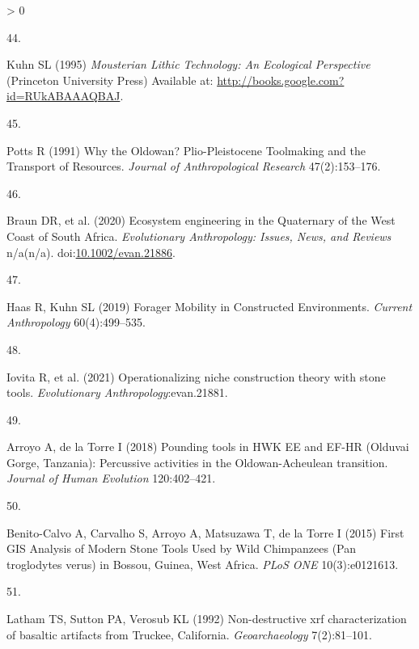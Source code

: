 \documentclass[9pt,twocolumn,twoside,]{pnas-new}
\newlength{\csllabelwidth}
\newlength{\cslhangindent}
\newenvironment{CSLReferences}[3] %
 {%
  \setlength{\parindent}{0pt}
  \ifodd #1 \everypar{\setlength{\hangindent}{\cslhangindent}}\ignorespaces\fi
  \ifnum #2 > 0
  \setlength{\parskip}{#2\baselineskip}
  \fi
 }%
 {}
\newcommand{\CSLLeftMargin}[1]{\parbox[t]{\csllabelwidth}{#1}}
\newcommand{\CSLRightInline}[1]{\parbox[t]{\linewidth - \csllabelwidth}{#1}}
\begin{document}
\begin{CSLReferences}{0}{0}
\leavevmode\hypertarget{ref-kuhnMousterianLithicTechnology1995}{}%
\CSLLeftMargin{44. }
\CSLRightInline{Kuhn SL (1995) \emph{Mousterian {Lithic Technology}: {An
Ecological Perspective}} ({Princeton University Press}) Available at:
\url{http://books.google.com?id=RUkABAAAQBAJ}.}

\leavevmode\hypertarget{ref-pottsWhyOldowanPlioPleistocene1991}{}%
\CSLLeftMargin{45. }
\CSLRightInline{Potts R (1991) Why the {Oldowan}? {Plio}-{Pleistocene
Toolmaking} and the {Transport} of {Resources}. \emph{Journal of
Anthropological Research} 47(2):153--176.}

\leavevmode\hypertarget{ref-braunEcosystemEngineeringQuaternary2020}{}%
\CSLLeftMargin{46. }
\CSLRightInline{Braun DR, et al. (2020) Ecosystem engineering in the
{Quaternary} of the {West Coast} of {South Africa}. \emph{Evolutionary
Anthropology: Issues, News, and Reviews} n/a(n/a).
doi:\href{https://doi.org/10.1002/evan.21886}{10.1002/evan.21886}.}

\leavevmode\hypertarget{ref-haasForagerMobilityConstructed2019}{}%
\CSLLeftMargin{47. }
\CSLRightInline{Haas R, Kuhn SL (2019) Forager {Mobility} in
{Constructed Environments}. \emph{Current Anthropology} 60(4):499--535.}

\leavevmode\hypertarget{ref-iovitaOperationalizingNicheConstruction2021}{}%
\CSLLeftMargin{48. }
\CSLRightInline{Iovita R, et al. (2021) Operationalizing niche
construction theory with stone tools. \emph{Evolutionary
Anthropology}:evan.21881.}

\leavevmode\hypertarget{ref-arroyoPoundingToolsHWK2018}{}%
\CSLLeftMargin{49. }
\CSLRightInline{Arroyo A, de la Torre I (2018) Pounding tools in {HWK
EE} and {EF}-{HR} ({Olduvai Gorge}, {Tanzania}): {Percussive} activities
in the {Oldowan}-{Acheulean} transition. \emph{Journal of Human
Evolution} 120:402--421.}

\leavevmode\hypertarget{ref-benito-calvoFirstGISAnalysis2015}{}%
\CSLLeftMargin{50. }
\CSLRightInline{Benito-Calvo A, Carvalho S, Arroyo A, Matsuzawa T, de la
Torre I (2015) First {GIS Analysis} of {Modern Stone Tools Used} by
{Wild Chimpanzees} ({Pan} troglodytes verus) in {Bossou}, {Guinea},
{West Africa}. \emph{PLoS ONE} 10(3):e0121613.}

\leavevmode\hypertarget{ref-lathamNondestructiveXrfCharacterization1992}{}%
\CSLLeftMargin{51. }
\CSLRightInline{Latham TS, Sutton PA, Verosub KL (1992) Non-destructive
xrf characterization of basaltic artifacts from {Truckee}, {California}.
\emph{Geoarchaeology} 7(2):81--101.}


\end{CSLReferences}
\end{document}
